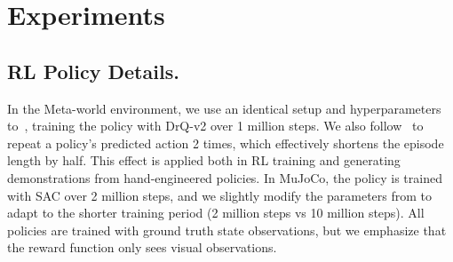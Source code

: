


\section{Experiments}

\subsection{RL Policy Details.\label{app:rl}}

 


In the Meta-world environment, we use an identical setup and hyperparameters to~\citet{fu2024robot}, training the policy with DrQ-v2 over 1 million steps. We also follow~\citet{fu2024robot} to repeat a policy's predicted action 2 times, which effectively shortens the episode length by half. This effect is applied both in RL training and generating demonstrations from hand-engineered policies. In MuJoCo, the policy is trained with SAC over 2 million steps, and we slightly modify the parameters from \citet{rocamonde2024visionlanguage} to adapt to the shorter training period (2 million steps vs 10 million steps). All policies are trained with ground truth state observations, but we emphasize that the reward function only sees visual observations.


